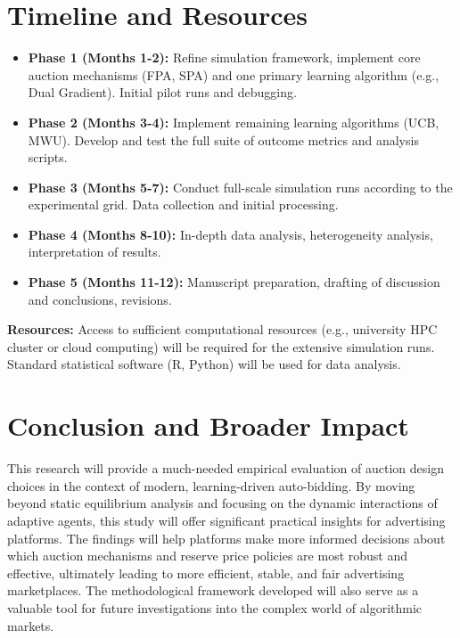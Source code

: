 \documentclass[12pt, a4paper]{article}
\begin{document}
\section{Timeline and Resources}
\begin{itemize}
    \item \textbf{Phase 1 (Months 1-2):} Refine simulation framework, implement core auction mechanisms (FPA, SPA) and one primary learning algorithm (e.g., Dual Gradient). Initial pilot runs and debugging.
    \item \textbf{Phase 2 (Months 3-4):} Implement remaining learning algorithms (UCB, MWU). Develop and test the full suite of outcome metrics and analysis scripts.
    \item \textbf{Phase 3 (Months 5-7):} Conduct full-scale simulation runs according to the experimental grid. Data collection and initial processing.
    \item \textbf{Phase 4 (Months 8-10):} In-depth data analysis, heterogeneity analysis, interpretation of results.
    \item \textbf{Phase 5 (Months 11-12):} Manuscript preparation, drafting of discussion and conclusions, revisions.
\end{itemize}
\textbf{Resources:} Access to sufficient computational resources (e.g., university HPC cluster or cloud computing) will be required for the extensive simulation runs. Standard statistical software (R, Python) will be used for data analysis.

\section{Conclusion and Broader Impact}
This research will provide a much-needed empirical evaluation of auction design choices in the context of modern, learning-driven auto-bidding. By moving beyond static equilibrium analysis and focusing on the dynamic interactions of adaptive agents, this study will offer significant practical insights for advertising platforms. The findings will help platforms make more informed decisions about which auction mechanisms and reserve price policies are most robust and effective, ultimately leading to more efficient, stable, and fair advertising marketplaces. The methodological framework developed will also serve as a valuable tool for future investigations into the complex world of algorithmic markets.

\end{document}
